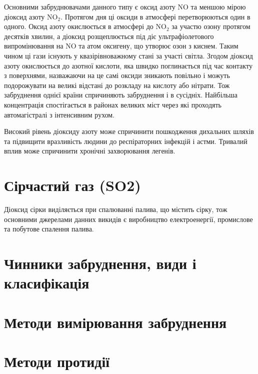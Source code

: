 \begin{center}
\end{center}

\vspace{0.75cm}



Основними забруднювачами данного типу є оксид азоту $\mathrm{NO}$ та меншою мірою 
діоксид азоту $\mathrm{NO}_2$. Протягом дня ці оксиди в атмосфері перетворюються один в одного. 
Оксид азоту окислюється в атмосфері до $\mathrm{NO}_2$ за участю озону протягом десятків 
хвилин, а діоксид розщеплюється під діє ультрафіолетового випромінювання на $\mathrm{NO}$ та 
атом оксигену, що утворює озон з киснем. Таким чином ці гази існують у квазірівноважному стані 
за участі світла. Згодом діоксид азоту окислюється до азотної кислоти, яка швидко поглинається 
під час контакту з поверхнями, назважаючи на це самі оксиди зникають повільно і 
можуть подорожувати на великі відстані до розкладу на кислоту або нітрати. Тож забруднення 
однієї країни спричиняють забруднення і в сусідніх. Найбільша концентрація 
спостігається в районах великих міст через які проходять автомагістралі з інтенсивним рухом.

Високий рівень діоксиду азоту може спричинити пошкодження дихальних шляхів та 
підвищити вразливість людини до респіраторних інфекцій і астми.
Тривалий вплив може спричинити хронічні захворювання легенів.


\section{Сірчастий газ (SO2)}

Діоксид сірки виділяється при спалюванні палива, що містить сірку, тож основними джерелами 
данних викидів є виробництво електроенергії, промислове та побутове спалення палива. 



\section{Чинники забруднення, види і класифікація}



\section{Методи вимірювання забруднення}

\section{Методи протидії}
